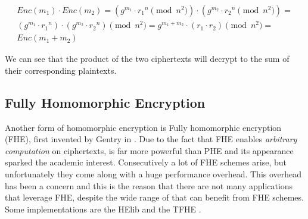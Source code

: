 \begin{equation}
  \label{eq:homomorphic-paillier}
  \begin{gathered}
Enc(m_1) \cdot Enc(m_2) = (g^{m_1} \cdot {r_1}^n \pmod{n^2}) \cdot (g^{m_2} \cdot {r_2}^n \pmod{n^2}) =\\ (g^{m_1} \cdot {r_1}^n) \cdot (g^{m_2} \cdot {r_2}^n)\pmod{n^2} = g^{m_1 + m_2} \cdot (r_1 \cdot r_2) \pmod{n^2} =\\ Enc({m_1} + {m_2})
  \end{gathered}
\end{equation}

We can see that the product of the two ciphertexts will decrypt to the sum of their corresponding plaintexts.

\subsection{Fully Homomorphic Encryption}\label{ss:fhe}
Another form of homomorphic encryption is Fully homomorphic encryption (FHE), first invented by Gentry in \cite{gentry2009fully}.
Due to the fact that FHE enables \textit{arbitrary computation} on ciphertexts, is far more powerful than PHE and its appearance sparked the academic interest.
Consecutively a lot of FHE schemes arise, but unfortunately they come along with a huge performance overhead.
This overhead has been a concern and this is the reason that there are not many applications that leverage FHE, despite the wide range of that can benefit from FHE schemes.
Some implementations are the HElib \cite{halevi2014algorithms} and the TFHE \cite{chillotti2016faster}.


